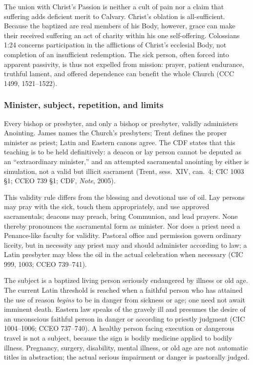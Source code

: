 The union with Christ's Passion is neither a cult of pain nor a claim that suffering adds deficient merit to Calvary. Christ's oblation is all-sufficient. Because the baptized are real members of his Body, however, grace can make their received suffering an act of charity within his one self-offering. Colossians 1:24 concerns participation in the afflictions of Christ's ecclesial Body, not completion of an insufficient redemption. The sick person, often forced into apparent passivity, is thus not expelled from mission: prayer, patient endurance, truthful lament, and offered dependence can benefit the whole Church (CCC 1499, 1521--1522).

\subsubsection{Minister, subject, repetition, and limits}

Every bishop or presbyter, and only a bishop or presbyter, validly administers Anointing. James names the Church's presbyters; Trent defines the proper minister as priest; Latin and Eastern canons agree. The CDF states that this teaching is to be held definitively: a deacon or lay person cannot be deputed as an ``extraordinary minister,'' and an attempted sacramental anointing by either is simulation, not a valid but illicit sacrament (Trent, sess.~XIV, can.~4; CIC 1003 \S1; CCEO 739 \S1; CDF, \emph{Note}, 2005).

This validity rule differs from the blessing and devotional use of oil. Lay persons may pray with the sick, touch them appropriately, and use approved sacramentals; deacons may preach, bring Communion, and lead prayers. None thereby pronounces the sacramental form as minister. Nor does a priest need a Penance-like faculty for validity. Pastoral office and permission govern ordinary liceity, but in necessity any priest may and should administer according to law; a Latin presbyter may bless the oil in the actual celebration when necessary (CIC 999, 1003; CCEO 739--741).

The subject is a baptized living person seriously endangered by illness or old age. The current Latin threshold is reached when a faithful person who has attained the use of reason \emph{begins} to be in danger from sickness or age; one need not await imminent death. Eastern law speaks of the gravely ill and presumes the desire of an unconscious faithful person in danger or according to priestly judgment (CIC 1004--1006; CCEO 737--740). A healthy person facing execution or dangerous travel is not a subject, because the sign is bodily medicine applied to bodily illness. Pregnancy, surgery, disability, mental illness, or old age are not automatic titles in abstraction; the actual serious impairment or danger is pastorally judged.

